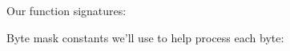 \documentclass[../index.tex]{subfiles}
\begin{document}
%
%
%
%
%
%
%
%
%
\begin{frame}{\currenttitle}
  Our function signatures:

\end{frame}

\begin{frame}{\currenttitle}
  Byte mask constants we'll use to help process each byte:

\end{frame}

\newcommand{\decodercodelisting}[2]{%
}
\begin{frame}{\currenttitle}
%
  \decodercodelisting{8}{13}
\end{frame}
\end{document}
